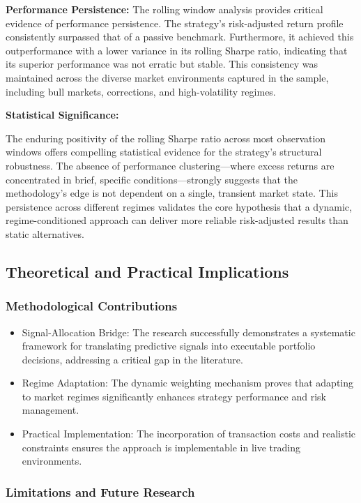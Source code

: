 \documentclass{singlecol-new}
\theoremstyle{TH}{
\newtheorem{lemma}{Lemma}
\newtheorem{theorem}[lemma]{Theorem}
\newtheorem{corrolary}[lemma]{Corrolary}
\newtheorem{conjecture}[lemma]{Conjecture}
\newtheorem{proposition}[lemma]{Proposition}
\newtheorem{claim}[lemma]{Claim}
\newtheorem{stheorem}[lemma]{Wrong Theorem}
\newtheorem{algorithm}{Algorithm}
}
\theoremstyle{THrm}{
\newtheorem{definition}{Definition}[section]
\newtheorem{question}{Question}[section]
\newtheorem{remark}{Remark}
\newtheorem{scheme}{Scheme}
}
\theoremstyle{THhit}{
\newtheorem{case}{Case}[section]
}
\begin{document}
\textbf{Performance Persistence:}
The rolling window analysis provides critical evidence of performance persistence. The strategy's risk-adjusted return profile consistently surpassed that of a passive benchmark. Furthermore, it achieved this outperformance with a lower variance in its rolling Sharpe ratio, indicating that its superior performance was not erratic but stable. This consistency was maintained across the diverse market environments captured in the sample, including bull markets, corrections, and high-volatility regimes.

\textbf{Statistical Significance:}

The enduring positivity of the rolling Sharpe ratio across most observation windows offers compelling statistical evidence for the strategy's structural robustness. The absence of performance clustering—where excess returns are concentrated in brief, specific conditions—strongly suggests that the methodology's edge is not dependent on a single, transient market state. This persistence across different regimes validates the core hypothesis that a dynamic, regime-conditioned approach can deliver more reliable risk-adjusted results than static alternatives.

\subsection{Theoretical and Practical Implications}
\subsubsection{Methodological Contributions}
\begin{itemize}
    \item Signal-Allocation Bridge: The research successfully demonstrates a systematic framework for translating predictive signals into executable portfolio decisions, addressing a critical gap in the literature.
    \item Regime Adaptation: The dynamic weighting mechanism proves that adapting to market regimes significantly enhances strategy performance and risk management.
    \item Practical Implementation: The incorporation of transaction costs and realistic constraints ensures the approach is implementable in live trading environments.
\end{itemize}

\subsubsection{Limitations and Future Research}
\end{document}
